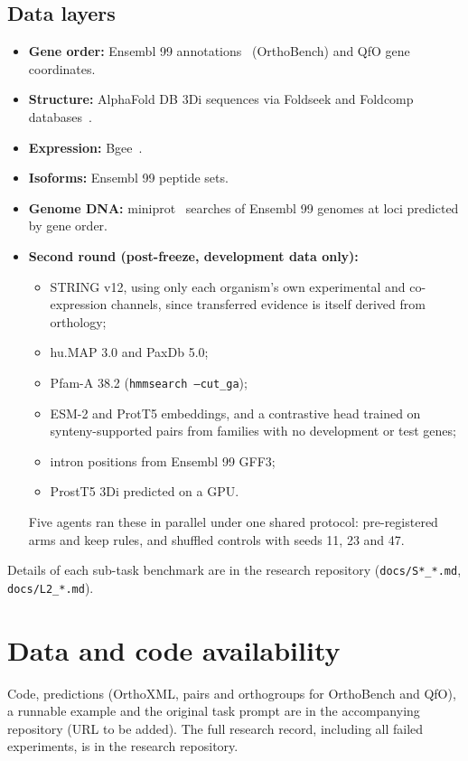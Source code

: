 \subsection*{Data layers}
\begin{itemize}
\item \textbf{Gene order:} Ensembl 99 annotations~\cite{yates2019ensembl} (OrthoBench) and QfO gene coordinates.
\item \textbf{Structure:} AlphaFold DB 3Di sequences via Foldseek and Foldcomp databases~\cite{vankempen2024foldseek,kim2023foldcomp,varadi2024alphafolddb}.
\item \textbf{Expression:} Bgee~\cite{bastian2025bgee}.
\item \textbf{Isoforms:} Ensembl 99 peptide sets.
\item \textbf{Genome DNA:} miniprot~\cite{li2023miniprot} searches of Ensembl 99 genomes at loci predicted by gene order.
\item \textbf{Second round (post-freeze, development data only):}
  \begin{itemize}
  \item STRING v12, using only each organism's own experimental and co-expression channels, since transferred evidence is itself derived from orthology;
  \item hu.MAP 3.0 and PaxDb 5.0;
  \item Pfam-A 38.2 (\texttt{hmmsearch --cut\_ga});
  \item ESM-2 and ProtT5 embeddings, and a contrastive head trained on synteny-supported pairs from families with no development or test genes;
  \item intron positions from Ensembl 99 GFF3;
  \item ProstT5 3Di predicted on a GPU.
  \end{itemize}
  Five agents ran these in parallel under one shared protocol: pre-registered arms and keep rules, and shuffled controls with seeds 11, 23 and 47.
\end{itemize}
Details of each sub-task benchmark are in the research repository (\texttt{docs/S*\_*.md}, \texttt{docs/L2\_*.md}).

\section*{Data and code availability}
Code, predictions (OrthoXML, pairs and orthogroups for OrthoBench and QfO), a runnable example and the original task prompt are in the accompanying repository (URL to be added). The full research record, including all failed experiments, is in the research repository.

